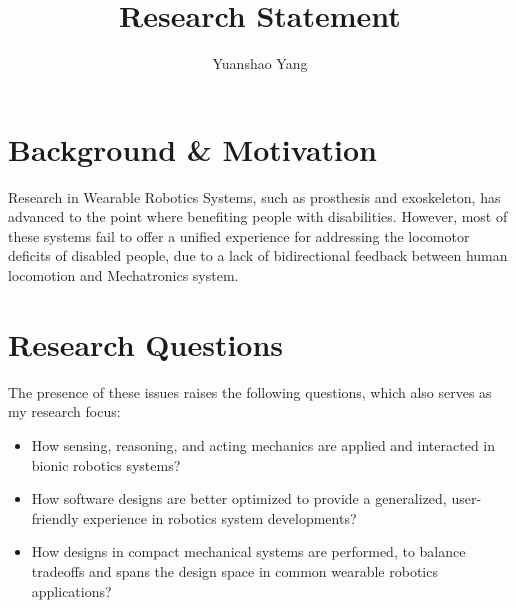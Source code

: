 \documentclass[8pt]{article}
\title{Research Statement}
\author{Yuanshao Yang}
\begin{document}
\maketitle


\section{Background \& Motivation}


Research in Wearable Robotics Systems, such as prosthesis and exoskeleton, has advanced to the point where benefiting people with disabilities. However, most of these systems fail to offer a unified experience for addressing the locomotor deficits of disabled people, due to a lack of bidirectional feedback between human locomotion and Mechatronics system. 


\section{Research Questions}


The presence of these issues raises the following questions, which also serves as my research focus: 

\begin{itemize}
            
    
    \item {How sensing, reasoning, and acting mechanics are applied and interacted in bionic robotics systems?}
    \item {How software designs are better optimized to provide a generalized, user-friendly experience in robotics system developments?}
    \item {How designs in compact mechanical systems are performed, to balance tradeoffs and spans the design space in common wearable robotics applications?}
    

\end{itemize}
\end{document}
